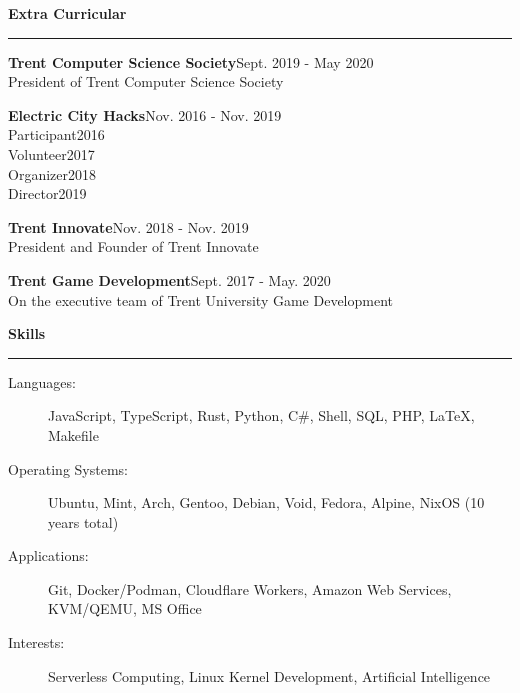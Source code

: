 \documentclass[letterpaper,11pt]{article}
\newcommand{\mysection}[1]{\vspace{5pt} {\bfseries #1} \\ {\color{gray} \rule[5pt]{\textwidth}{1pt}}}
\begin{document}
\mysection{Extra Curricular}
\begin{description}
    \item \textbf{Trent Computer Science Society}\hfill Sept. 2019 - May 2020\\
        President of Trent Computer Science Society
    \item \textbf{Electric City Hacks}\hfill Nov. 2016 - Nov. 2019\\
        Participant\hfill 2016\\
        Volunteer\hfill 2017\\
        Organizer\hfill 2018\\
        Director\hfill 2019
    \item \textbf{Trent Innovate}\hfill Nov. 2018 - Nov. 2019\\
        President and Founder of Trent Innovate
    \item \textbf{Trent Game Development}\hfill Sept. 2017 - May. 2020\\
        On the executive team of Trent University Game Development
\end{description}

\mysection{Skills}
\begin{description}
    \item[Languages:]
        JavaScript, TypeScript, Rust, Python, C\#, Shell, SQL, PHP, \LaTeX{}, Makefile
    \item[Operating Systems:]
        Ubuntu, Mint, Arch, Gentoo, Debian, Void, Fedora, Alpine, NixOS (10 years total)
    \item[Applications:]
        Git, Docker/Podman, Cloudflare Workers, Amazon Web Services, KVM/QEMU, MS Office
    \item[Interests:]
        Serverless Computing, Linux Kernel Development, Artificial Intelligence
\end{description}
\end{document}
